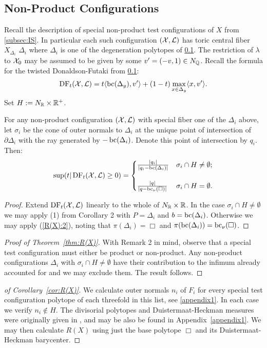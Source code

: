 \subsection{Non-Product Configurations}
Recall the description of special non-product test configurations of \(X\) from \ref{subsec:IS}. In particular each such configuration \(({\mathcal{X}},\mathcal{L})\) has toric central fiber \(X_{\Delta_i}\) \(\Delta_i\) where \(\Delta_i\) is one of the degeneration polytopes of \ref{}. The restriction of \(\lambda\) to \({\mathcal{X}}_0\) may be assumed to be given by some \(v' = (-v,1) \in N_{\mathbb{Q}} \). Recall the formula for the twisted Donaldson-Futaki from \ref{}:
\[
\mathop{\rm DF}\nolimits_t( {\mathcal{X}}, \mathcal{L} )  = t \langle \mathop{\rm bc}\nolimits(\Delta_y), v' \rangle + (1-t) \max_{x \in \Delta_y} \langle x, v' \rangle.
\]
Set \(H := N_{\mathbb{R}} \times \mathbb{R}^+\).
\begin{proposition}
For any non-product configuration \(({\mathcal{X}},\mathcal{L})\) with special fiber one of the \(\Delta_i\) above, let \(\sigma_i\) be the cone of outer normals to \(\Delta_i\) at the unique point of intersection of \(\partial \Delta_i\) with the ray generated by \(-\mathop{\rm bc}\nolimits(\Delta_i)\). Denote this point of intersection by \(q_i\). Then:
\[
\sup(t | \mathop{\rm DF}\nolimits_t({\mathcal{X}},\mathcal{L}) \ge 0) =\begin{cases} 
     \frac{|q_i|}{|q_i - \mathop{\rm bc}\nolimits(\Delta_i)|} & \sigma_i \cap H \neq \emptyset ;\\ \\
      \frac{|q|}{|q-\mathop{\rm bc}\nolimits_\nu(\Box)|} & \sigma_i \cap H = \emptyset.
   \end{cases}
\]
\end{proposition}
\begin{proof}
Extend \(\mathop{\rm DF}\nolimits_t({\mathcal{X}},\mathcal{L})\) linearly to the whole of \(N_{\mathbb{R}} \times \mathbb{R}\). In the case \(\sigma_i \cap H \neq \emptyset\) we may apply (1) from Corollary 2 with \(P = \Delta_i\) and \(b = \mathop{\rm bc}\nolimits(\Delta_i)\). Otherwise we may apply (\ref{R(X):2}), noting that \(\pi(\Delta_i) = \Box\) and \(\pi(\mathop{\rm bc}\nolimits(\Delta_i)) = \mathop{\rm bc}\nolimits_\nu( \Box)\).
\end{proof}
\begin{proof}[Proof of Theorem~\ref{thm:R(X)}]
With Remark 2 in mind, observe that a special test configuration must either be product or non-product. Any non-product configurations \(\Delta_i\) with \(\sigma_i \cap H \neq \emptyset\) have their contribution to the infimum already accounted for and we may exclude them. The result follows.
\end{proof}
\begin{proof}[of Corollary~\ref{cor:R(X)}]
We calculate outer normals \(n_i \) of \(F_i\) for every special test configuration polytope of each threefold in this list, see \ref{appendix1}. In each case we verify \(n_i \notin H\). The divisorial polytopes and Duistermaat-Heckman measures were originally given in \cite{suss2013fano}, and may be also be found in Appendix~\ref{appendix1}. We may then calculate \(R(X)\) using just the base polytope \(\Box\) and its Duistermaat-Heckman barycenter.
\end{proof}